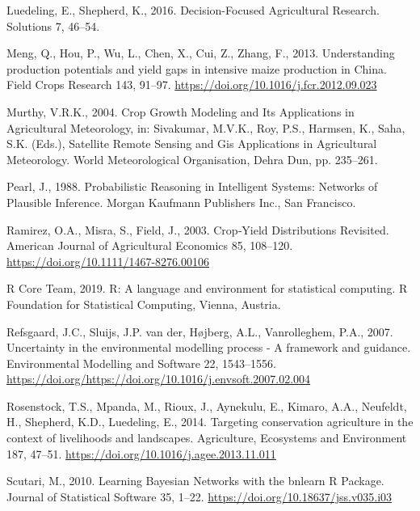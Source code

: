 \documentclass[]{elsarticle} %
\begin{document}
\leavevmode\hypertarget{ref-Luedeling_and_Shepherd_2016}{}%
Luedeling, E., Shepherd, K., 2016. Decision-Focused Agricultural Research. Solutions 7, 46--54.

\leavevmode\hypertarget{ref-Meng_et_al_2013}{}%
Meng, Q., Hou, P., Wu, L., Chen, X., Cui, Z., Zhang, F., 2013. Understanding production potentials and yield gaps in intensive maize production in China. Field Crops Research 143, 91--97. \url{https://doi.org/10.1016/j.fcr.2012.09.023}

\leavevmode\hypertarget{ref-Murthy_2004}{}%
Murthy, V.R.K., 2004. Crop Growth Modeling and Its Applications in Agricultural Meteorology, in: Sivakumar, M.V.K., Roy, P.S., Harmsen, K., Saha, S.K. (Eds.), Satellite Remote Sensing and Gis Applications in Agricultural Meteorology. World Meteorological Organisation, Dehra Dun, pp. 235--261.

\leavevmode\hypertarget{ref-Pearl_1988}{}%
Pearl, J., 1988. Probabilistic Reasoning in Intelligent Systems: Networks of Plausible Inference. Morgan Kaufmann Publishers Inc., San Francisco.

\leavevmode\hypertarget{ref-Ramirez_et_al_2003}{}%
Ramirez, O.A., Misra, S., Field, J., 2003. Crop‐Yield Distributions Revisited. American Journal of Agricultural Economics 85, 108--120. \url{https://doi.org/10.1111/1467-8276.00106}

\leavevmode\hypertarget{ref-R_Core_Team_2019}{}%
R Core Team, 2019. R: A language and environment for statistical computing. R Foundation for Statistical Computing, Vienna, Austria.

\leavevmode\hypertarget{ref-Refsgaard_et_al_2007}{}%
Refsgaard, J.C., Sluijs, J.P. van der, Højberg, A.L., Vanrolleghem, P.A., 2007. Uncertainty in the environmental modelling process - A framework and guidance. Environmental Modelling and Software 22, 1543--1556. \url{https://doi.org/https://doi.org/10.1016/j.envsoft.2007.02.004}

\leavevmode\hypertarget{ref-Rosenstock_et_al_2014}{}%
Rosenstock, T.S., Mpanda, M., Rioux, J., Aynekulu, E., Kimaro, A.A., Neufeldt, H., Shepherd, K.D., Luedeling, E., 2014. Targeting conservation agriculture in the context of livelihoods and landscapes. Agriculture, Ecosystems and Environment 187, 47--51. \url{https://doi.org/10.1016/j.agee.2013.11.011}

\leavevmode\hypertarget{ref-Scutari_2010}{}%
Scutari, M., 2010. Learning Bayesian Networks with the bnlearn R Package. Journal of Statistical Software 35, 1--22. \url{https://doi.org/10.18637/jss.v035.i03}
\end{document}
